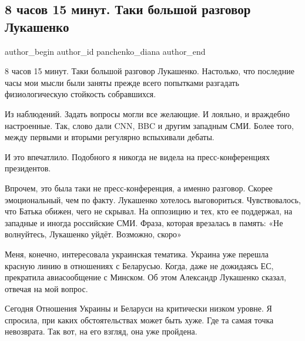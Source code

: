  
 
 
 
 
 
\subsection{8 часов 15 минут. Таки большой разговор Лукашенко}
\label{sec:10_08_2021.fb.panchenko_diana.1.lukashenko_razgovor}
 
\ifcmt
 author_begin
   author_id panchenko_diana
 author_end
\fi

8 часов 15 минут. Таки большой разговор Лукашенко. Настолько, что последние
часы мои мысли были заняты прежде всего попытками разгадать физиологическую
стойкость собравшихся. 

Из наблюдений. Задать вопросы могли все желающие. И лояльно, и враждебно
настроенные. Так, слово дали CNN, BBC и другим западным СМИ.  Более того, между
первыми и вторыми регулярно вспыхивали дебаты. 

И это впечатлило. Подобного я никогда не видела на пресс-конференциях президентов. 

Впрочем, это была таки не пресс-конференция, а именно разговор. Скорее
эмоциональный, чем по факту. Лукашенко хотелось выговориться. Чувствовалось,
что Батька обижен, чего не скрывал. На оппозицию и тех, кто ее поддержал, на
западные и иногда российские СМИ. Фраза, которая врезалась в память: «Не
волнуйтесь, Лукашенко уйдёт. Возможно, скоро»

Меня, конечно, интересовала украинская тематика. Украина уже перешла красную
линию в отношениях с Беларусью. Когда, даже не дожидаясь ЕС, прекратила
авиасообщение с Минском. Об этом Александр Лукашенко сказал, отвечая на мой
вопрос. 

Сегодня Отношения Украины и Беларуси на критически низком уровне. Я спросила,
при каких обстоятельствах может быть хуже. Где та самая точка невозврата. Так
вот, на его взгляд, она уже пройдена. 

